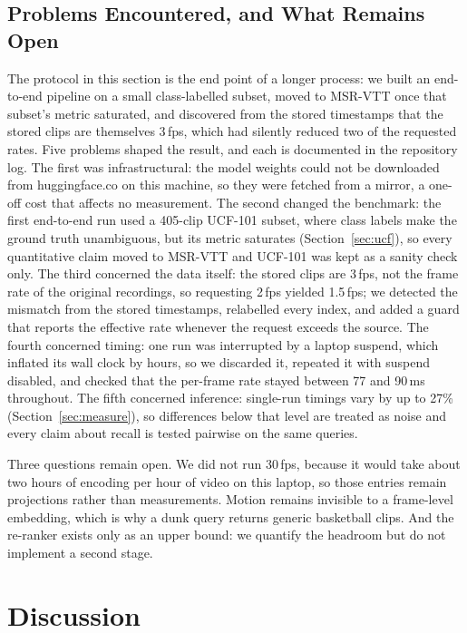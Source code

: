 \documentclass[journal]{IEEEtran}
\begin{document}
\subsection{Problems Encountered, and What Remains Open}
The protocol in this section is the end point of a longer process: we built an end-to-end pipeline
on a small class-labelled subset, moved to MSR-VTT once that subset's metric saturated, and
discovered from the stored timestamps that the stored clips are themselves 3\,fps, which had
silently reduced two of the requested rates. Five problems shaped the result, and each is
documented in the repository log. The first was
infrastructural: the model weights could not be downloaded from huggingface.co on this machine, so
they were fetched from a mirror, a one-off cost that affects no measurement. The second changed the
benchmark: the first end-to-end run used a 405-clip UCF-101 subset, where class labels make the
ground truth unambiguous, but its metric saturates (Section~\ref{sec:ucf}), so every quantitative
claim moved to MSR-VTT and UCF-101 was kept as a sanity check only. The third concerned the data
itself: the stored clips are 3\,fps, not the frame rate of the original recordings, so requesting
2\,fps yielded 1.5\,fps; we detected the mismatch from the stored timestamps, relabelled every
index, and added a guard that reports the effective rate whenever the request exceeds the source.
The fourth concerned timing: one run was interrupted by a laptop suspend, which inflated its wall
clock by hours, so we discarded it, repeated it with suspend disabled, and checked that the
per-frame rate stayed between 77 and 90\,ms throughout. The fifth concerned inference: single-run
timings vary by up to 27\% (Section~\ref{sec:measure}), so differences below that level are treated as
noise and every claim about recall is tested pairwise on the same queries.

Three questions remain open. We did not run 30\,fps, because it would take about two hours of
encoding per hour of video on this laptop, so those entries remain projections rather than
measurements. Motion remains invisible to a frame-level embedding, which is why a dunk query
returns generic basketball clips. And the re-ranker exists only as an upper bound: we quantify the
headroom but do not implement a second stage.

\section{Discussion}\label{sec:discussion}
\end{document}
